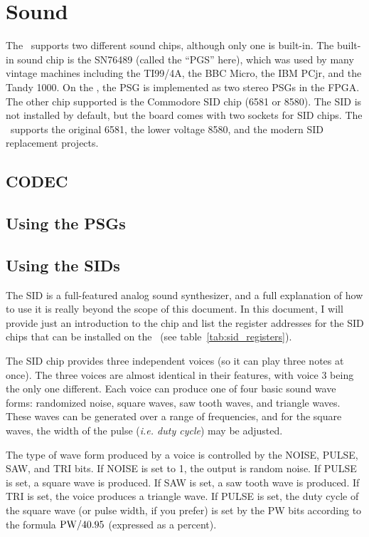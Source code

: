 \chapter{Sound}

The \jr\ supports two different sound chips, although only one is built-in. The built-in sound chip is the SN76489 (called the ``PGS'' here), which was used by many vintage machines including the TI99/4A, the BBC Micro, the IBM PCjr, and the Tandy 1000. On the \jr, the PSG is implemented as two stereo PSGs in the FPGA. The other chip supported is the Commodore SID chip (6581 or 8580). The SID is not installed by default, but the board comes with two sockets for SID chips. The \jr\ supports the original 6581, the lower voltage 8580, and the modern SID replacement projects.

\section{CODEC}

\section{Using the PSGs}

\section{Using the SIDs}

The SID is a full-featured analog sound synthesizer, and a full explanation of how to use it is really beyond the scope of this document. In this document, I will provide just an introduction to the chip and list the register addresses for the SID chips that can be installed on the \jr\ (see table~\ref{tab:sid_registers}).

The SID chip provides three independent voices (so it can play three notes at once). The three voices are almost identical in their features, with voice 3 being the only one different. Each voice can produce one of four basic sound wave forms: randomized noise, square waves, saw tooth waves, and triangle waves. These waves can be generated over a range of frequencies, and for the square waves, the width of the pulse ({\it i.e. duty cycle}) may be adjusted.

The type of wave form produced by a voice is controlled by the NOISE, PULSE, SAW, and TRI bits. If NOISE is set to 1, the output is random noise. If PULSE is set, a square wave is produced. If SAW is set, a saw tooth wave is produced. If TRI is set, the voice produces a triangle wave. If PULSE is set, the duty cycle of the square wave (or pulse width, if you prefer) is set by the PW bits according to the formula
${\rm PW} / 40.95$ (expressed as a percent).

